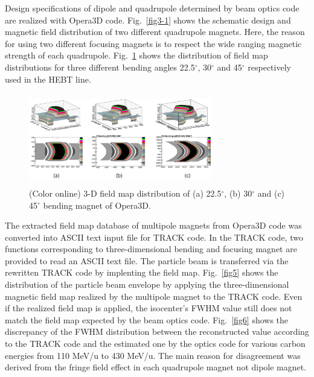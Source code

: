 \documentclass[jkps,preprint,fleqn,showpacs,showkeys,10pt,twocolumn]{revtex4}
\begin{document}
Design specifications of dipole and quadrupole determined by beam optics code are realized with Opera3D code.
Fig.~\ref{fig3-1} shows the schematic design and magnetic field distribution of two different quadrupole magnets.
Here, the reason for using two different
focusing magnets is to respect the wide ranging magnetic strength of each quadrupole.
Fig.~\ref{fig4} shows the distribution of field map distributions
for three different bending angles 22.5$^{\circ}$, 30$^{\circ}$ and 45$^{\circ}$ respectively used in the HEBT line.
\begin{figure}
  \begin{center}
    \includegraphics[width=8.0cm, height=4cm]{Fig05.png}
    \caption{(Color online) 3-D field map distribution of (a) 22.5$^{\circ}$, (b) 30$^{\circ}$ and (c) 45$^{\circ}$ bending magnet of Opera3D.}
    \label{fig4}
  \end{center}
\end{figure}
The extracted field map database of multipole magnets from Opera3D code was converted into ASCII text input file for TRACK code.
In the TRACK code, two functions corresponding to three-dimensional bending and focusing magnet are provided to read an ASCII text file.
The particle beam is transferred via the rewritten TRACK code by implenting the field map.
Fig.~\ref{fig5} shows the distribution of the particle beam envelope by applying the three-dimensional magnetic field map
realized by the multipole magnet to the TRACK code.
Even if the realized field map is applied, the isocenter's FWHM value still does not match the field map expected by the beam optics code.
Fig.~\ref{fig6} shows the discrepancy of the FWHM distribution between the reconstructed value according to the TRACK code
and the estimated one by the optics code for various carbon energies from 110 MeV/u to 430 MeV/u.   
The main reason for disagreement was derived from the fringe field effect in each quadrupole magnet not dipole magnet.
\end{document}
